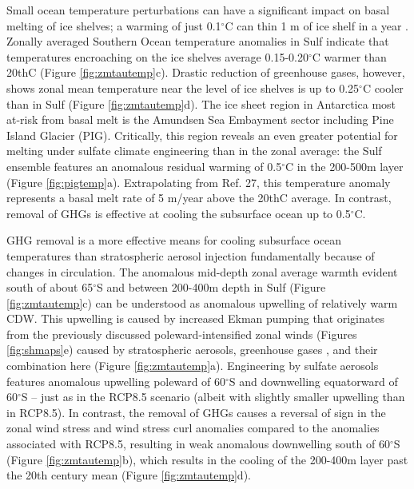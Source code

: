 \documentclass{nature}
\begin{document}
Small ocean temperature perturbations can have a significant impact on basal melting of ice shelves; a warming of just 0.1$^\circ$C can thin 1 m of ice shelf in a year \cite{rignot02}. Zonally averaged Southern Ocean temperature anomalies in Sulf indicate that temperatures encroaching on the ice shelves average 0.15-0.20$^\circ$C warmer than 20thC (Figure \ref{fig:zmtautemp}c). Drastic reduction of greenhouse gases, however, shows zonal mean temperature near the level of ice shelves is up to 0.25$^\circ$C cooler than in Sulf (Figure \ref{fig:zmtautemp}d). The ice sheet region in Antarctica most at-risk from basal melt is the Amundsen Sea Embayment sector including Pine Island Glacier (PIG). Critically, this region reveals an even greater potential for melting under sulfate climate engineering than in the zonal average: the Sulf ensemble features an anomalous residual warming of 0.5$^\circ$C in the 200-500m layer (Figure \ref{fig:pigtemp}a). Extrapolating from Ref. 27, this temperature anomaly represents a basal melt rate of 5 m/year above the 20thC average. In contrast, removal of GHGs is effective at cooling the subsurface ocean up to 0.5$^\circ$C. %

GHG removal is a more effective means for cooling subsurface ocean temperatures than stratospheric aerosol injection fundamentally because of changes in circulation. The anomalous mid-depth zonal average warmth evident south of about 65$^\circ$S and between 200-400m depth in Sulf (Figure \ref{fig:zmtautemp}c) can be understood as anomalous upwelling of relatively warm CDW. This upwelling is caused by increased Ekman pumping that originates from the previously discussed poleward-intensified zonal winds (Figures \ref{fig:shmaps}e) caused by stratospheric aerosols, greenhouse gases \cite{fyfe07}, and their combination here (Figure \ref{fig:zmtautemp}a). Engineering by sulfate aerosols features anomalous upwelling poleward of 60$^\circ$S and downwelling equatorward of 60$^\circ$S -- just as in the RCP8.5 scenario (albeit with slightly smaller upwelling than in RCP8.5). In contrast, the removal of GHGs causes a reversal of sign in the zonal wind stress and wind stress curl anomalies compared to the anomalies associated with RCP8.5, resulting in weak anomalous downwelling south of 60$^\circ$S (Figure \ref{fig:zmtautemp}b), which results in the cooling of the 200-400m layer past the 20th century mean (Figure \ref{fig:zmtautemp}d). 
\end{document}

